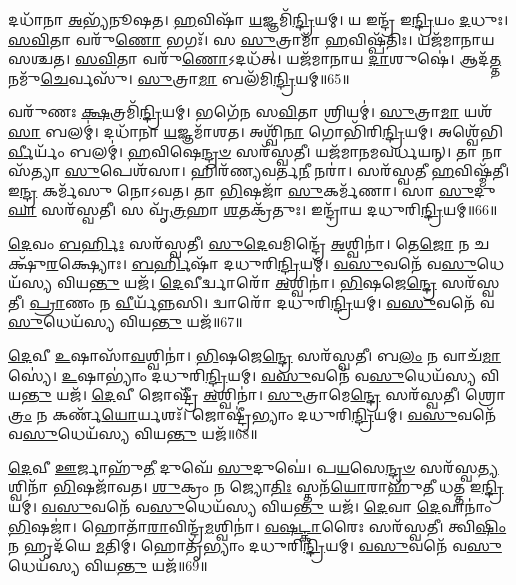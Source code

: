 𑌦𑌧𑌾᳴𑌨𑌾 \ul{𑌅}\-𑌭𑍍𑌯᳴𑌨𑍂𑌷𑌤।
\-\ul{𑌹}\-𑌵𑌿𑌷𑌾᳴ \ul{𑌯}\-𑌜𑍍𑌞𑌮𑌿᳴\-\ul{𑌨𑍍𑌦𑍍𑌰𑌿}\-𑌯𑌮𑍍।
𑌯 𑌇𑌨𑍍𑌦𑍍𑌰᳴ 𑌇\-\ul{𑌨𑍍𑌦𑍍𑌰𑌿}\-𑌯𑌂 \ul{𑌦}\-𑌧𑍁𑌃।
\-\ul{𑌸}\-\-\ul{𑌵𑌿}\-𑌤𑌾 𑌵𑌰𑍁᳴\-\ul{𑌣𑍋} 𑌭𑌗𑌃᳴।
𑌸 \ul{𑌸𑍁}\-𑌤𑍍𑌰𑌾𑌮𑌾᳴ \ul{𑌹}\-𑌵𑌿𑌷𑍍𑌪᳴𑌤𑌿𑌃।
𑌯𑌜᳴𑌮𑌾𑌨𑌾𑌯 𑌸𑌶𑍍𑌚𑌤।
\-\ul{𑌸}\-\-\ul{𑌵𑌿}\-𑌤𑌾 𑌵𑌰𑍁᳴\-\ul{𑌣𑍋}\-\-𑌽𑌦𑌧᳴𑌤𑍍।
𑌯𑌜᳴𑌮𑌾𑌨𑌾𑌯 \ul{𑌦𑌾}\-𑌶𑍁𑌷𑍇॑।
𑌆𑌦᳴\-\ul{𑌤𑍍𑌤} 𑌨𑌮𑍁᳴\-\ul{𑌚𑍇}\-𑌰𑍍𑌵𑌸𑍁᳴।
\-\ul{𑌸𑍁}\-𑌤𑍍𑌰𑌾\-\ul{𑌮𑌾} 𑌬𑌲᳴𑌮𑌿\-\ul{𑌨𑍍𑌦𑍍𑌰𑌿}\-𑌯𑌮𑍍॥65॥

𑌵𑌰𑍁᳴𑌣𑌃 \ul{𑌕𑍍𑌷}\-𑌤𑍍𑌰𑌮𑌿᳴\-\ul{𑌨𑍍𑌦𑍍𑌰𑌿}\-𑌯𑌮𑍍।
𑌭𑌗𑍇᳴𑌨 𑌸\-\ul{𑌵𑌿}\-𑌤𑌾 𑌶𑍍𑌰𑌿𑌯𑌮𑍍॑।
\-\ul{𑌸𑍁}\-𑌤𑍍𑌰𑌾\-\ul{𑌮𑌾} 𑌯𑌶᳴\-\ul{𑌸𑌾} 𑌬𑌲𑌮𑍍॑।
𑌦𑌧𑌾᳴𑌨𑌾 \ul{𑌯}\-𑌜𑍍𑌞𑌮𑌾᳴𑌶𑌤।
𑌅𑌶𑍍𑌵𑌿᳴\-\ul{𑌨𑌾} 𑌗𑍋𑌭𑌿᳴𑌰𑌿\-\ul{𑌨𑍍𑌦𑍍𑌰𑌿}\-𑌯𑌮𑍍।
𑌅𑌶𑍍𑌵𑍇᳴𑌭𑌿\-\ul{𑌰𑍍𑌵𑍀}\-𑌰𑍍𑌯𑌂᳴ 𑌬𑌲𑌮𑍍॑।
\-\ul{𑌹}\-𑌵𑌿𑌷𑍇\-\ul{𑌨𑍍𑌦𑍍𑌰}\-\-\ul{𑍞} 𑌸𑌰᳴𑌸𑍍𑌵𑌤𑍀।
𑌯𑌜᳴𑌮𑌾𑌨𑌮𑌵𑌰𑍍𑌧𑌯𑌨𑍍।
𑌤𑌾 𑌨𑌾𑌸᳴𑌤𑍍𑌯𑌾 \ul{𑌸𑍁}\-𑌪𑍇𑌶᳴𑌸𑌾।
𑌹𑌿𑌰᳴𑌣𑍍𑌯𑌵𑌰𑍍𑌤\-\ul{𑌨𑍀} 𑌨𑌰𑌾॑।
𑌸𑌰᳴𑌸𑍍𑌵𑌤𑍀 \ul{𑌹}\-𑌵𑌿𑌷𑍍𑌮᳴𑌤𑍀।
𑌇\-\ul{𑌨𑍍𑌦𑍍𑌰} 𑌕𑌰𑍍𑌮᳴𑌸𑍁 𑌨𑍋𑌽𑌵𑌤।
𑌤𑌾 \ul{𑌭𑌿}\-𑌷𑌜𑌾᳴ \ul{𑌸𑍁}\-𑌕𑌰𑍍𑌮᳴𑌣𑌾।
𑌸𑌾 \ul{𑌸𑍁}\-𑌦𑍁\-\ul{𑌘𑌾} 𑌸𑌰᳴𑌸𑍍𑌵𑌤𑍀।
𑌸 𑌵𑍃᳴\-\ul{𑌤𑍍𑌰}\-𑌹𑌾 \ul{𑌶}\-𑌤𑌕𑍍𑌰᳴𑌤𑍁𑌃।
𑌇𑌨𑍍𑌦𑍍𑌰𑌾᳴𑌯 𑌦𑌧𑍁𑌰𑌿\-\ul{𑌨𑍍𑌦𑍍𑌰𑌿}\-𑌯𑌮𑍍॥66॥\anuvakamend[\-\ul{𑌉}\-𑌭𑌾 𑌸𑌰᳴𑌸𑍍𑌵\-\ul{𑌤𑍀} 𑌬𑌲᳴𑌮𑌿\-\ul{𑌨𑍍𑌦𑍍𑌰𑌿}\-𑌯𑌨𑍍𑌨\-\ul{𑌰𑌾} 𑌷𑌟𑍍𑌚᳴]

\-\ul{𑌦𑍇}\-𑌵𑌂 \ul{𑌬}\-\-\ul{𑌰𑍍}\-𑌹𑌿𑌃 𑌸𑌰᳴𑌸𑍍𑌵𑌤𑍀।
\-\ul{𑌸𑍁}\-\-\ul{𑌦𑍇}\-𑌵𑌮𑌿𑌨𑍍𑌦𑍍𑌰𑍇᳴ \ul{𑌅}\-𑌶𑍍𑌵𑌿𑌨𑌾॑।
𑌤𑍇\-\ul{𑌜𑍋} 𑌨 𑌚𑌕𑍍𑌷𑍁᳴\-\ul{𑌰}\-𑌕𑍍𑌷𑍍𑌯𑍋𑌃।
\-\ul{𑌬}\-\-\ul{𑌰𑍍}\-𑌹𑌿𑌷𑌾᳴ 𑌦𑌧𑍁𑌰𑌿\-\ul{𑌨𑍍𑌦𑍍𑌰𑌿}\-𑌯𑌮𑍍।
\-\ul{𑌵}\-\-\ul{𑌸𑍁}\-𑌵𑌨𑍇᳴ 𑌵\-\ul{𑌸𑍁}\-𑌧𑍇𑌯᳴𑌸𑍍𑌯 𑌵𑌿𑌯\-\ul{𑌨𑍍𑌤𑍁} 𑌯𑌜᳴।
\-\ul{𑌦𑍇}\-𑌵𑍀𑌰𑍍𑌦𑍍𑌵𑌾𑌰𑍋᳴ \ul{𑌅}\-𑌶𑍍𑌵𑌿𑌨𑌾॑।
\-\ul{𑌭𑌿}\-𑌷𑌜𑍇\-\ul{𑌨𑍍𑌦𑍍𑌰𑍇} 𑌸𑌰᳴𑌸𑍍𑌵𑌤𑍀।
\-\ul{𑌪𑍍𑌰𑌾}\-𑌣𑌂 𑌨 \ul{𑌵𑍀}\-𑌰𑍍𑌯᳴\-\ul{𑌨𑍍𑌨}\-𑌸𑌿।
𑌦𑍍𑌵𑌾𑌰𑍋᳴ 𑌦𑌧𑍁𑌰𑌿\-\ul{𑌨𑍍𑌦𑍍𑌰𑌿}\-𑌯𑌮𑍍।
\-\ul{𑌵}\-\-\ul{𑌸𑍁}\-𑌵𑌨𑍇᳴ 𑌵\-\ul{𑌸𑍁}\-𑌧𑍇𑌯᳴𑌸𑍍𑌯 𑌵𑌿𑌯\-\ul{𑌨𑍍𑌤𑍁} 𑌯𑌜᳴॥67॥

\-\ul{𑌦𑍇}\-𑌵𑍀 \ul{𑌉}\-𑌷𑌾𑌸𑌾᳴\-\ul{𑌵}\-𑌶𑍍𑌵𑌿𑌨𑌾॑।
\-\ul{𑌭𑌿}\-𑌷𑌜𑍇\-\ul{𑌨𑍍𑌦𑍍𑌰𑍇} 𑌸𑌰᳴𑌸𑍍𑌵𑌤𑍀।
𑌬\-\ul{𑌲𑌂} 𑌨 𑌵𑌾𑌚᳴\-\ul{𑌮𑌾}\-𑌸𑍍𑌯𑍇॑।
\-\ul{𑌉}\-𑌷𑌾𑌭𑍍𑌯𑌾𑌂॑ 𑌦𑌧𑍁𑌰𑌿\-\ul{𑌨𑍍𑌦𑍍𑌰𑌿}\-𑌯𑌮𑍍।
\-\ul{𑌵}\-\-\ul{𑌸𑍁}\-𑌵𑌨𑍇᳴ 𑌵\-\ul{𑌸𑍁}\-𑌧𑍇𑌯᳴𑌸𑍍𑌯 𑌵𑌿𑌯\-\ul{𑌨𑍍𑌤𑍁} 𑌯𑌜᳴।
\-\ul{𑌦𑍇}\-𑌵𑍀 𑌜𑍋𑌷𑍍𑌟𑍍𑌰𑍀᳴ \ul{𑌅}\-𑌶𑍍𑌵𑌿𑌨𑌾॑।
\-\ul{𑌸𑍁}\-𑌤𑍍𑌰𑌾𑌮𑍇\-\ul{𑌨𑍍𑌦𑍍𑌰𑍇} 𑌸𑌰᳴𑌸𑍍𑌵𑌤𑍀।
𑌶𑍍𑌰𑍋\-\ul{𑌤𑍍𑌰𑌂} 𑌨 𑌕𑌰𑍍𑌣᳴\-\ul{𑌯𑍋}\-𑌰𑍍𑌯𑌶𑌃᳴।
𑌜𑍋𑌷𑍍𑌟𑍍𑌰𑍀॑𑌭𑍍𑌯𑌾𑌂 𑌦𑌧𑍁𑌰𑌿\-\ul{𑌨𑍍𑌦𑍍𑌰𑌿}\-𑌯𑌮𑍍।
\-\ul{𑌵}\-\-\ul{𑌸𑍁}\-𑌵𑌨𑍇᳴ 𑌵\-\ul{𑌸𑍁}\-𑌧𑍇𑌯᳴𑌸𑍍𑌯 𑌵𑌿𑌯\-\ul{𑌨𑍍𑌤𑍁} 𑌯𑌜᳴॥68॥

\-\ul{𑌦𑍇}\-𑌵𑍀 \ul{𑌊}\-𑌰𑍍𑌜𑌾𑌹𑍁᳴\-\ul{𑌤𑍀} 𑌦𑍁𑌘𑍇᳴ \ul{𑌸𑍁}\-𑌦𑍁𑌘𑍇॑।
𑌪\-\ul{𑌯}\-𑌸𑍇\-\ul{𑌨𑍍𑌦𑍍𑌰}\-\-\ul{𑍞} 𑌸𑌰᳴𑌸𑍍𑌵\-\ul{𑌤𑍍𑌯}\-𑌶𑍍𑌵𑌿𑌨𑌾᳴ \ul{𑌭𑌿}\-𑌷𑌜𑌾᳴𑌵𑌤।
\-\ul{𑌶𑍁}\-𑌕𑍍𑌰𑌂 𑌨 𑌜𑍍𑌯𑍋\-\ul{𑌤𑌿𑌃} 𑌸𑍍𑌤𑌨᳴\-\ul{𑌯𑍋}\-𑌰𑌾𑌹𑍁᳴𑌤𑍀 𑌧𑌤𑍍𑌤 𑌇\-\ul{𑌨𑍍𑌦𑍍𑌰𑌿}\-𑌯𑌮𑍍।
\-\ul{𑌵}\-\-\ul{𑌸𑍁}\-𑌵𑌨𑍇᳴ 𑌵\-\ul{𑌸𑍁}\-𑌧𑍇𑌯᳴𑌸𑍍𑌯 𑌵𑌿𑌯\-\ul{𑌨𑍍𑌤𑍁} 𑌯𑌜᳴।
\-\ul{𑌦𑍇}\-𑌵𑌾 \ul{𑌦𑍇}\-𑌵𑌾𑌨𑌾𑌂॑ \ul{𑌭𑌿}\-𑌷𑌜𑌾॑।
𑌹𑍋𑌤𑌾᳴\-\ul{𑌰𑌾}\-𑌵𑌿𑌨𑍍𑌦𑍍𑌰᳴\-\ul{𑌮}\-𑌶𑍍𑌵𑌿𑌨𑌾॑।
\-\ul{𑌵}\-\-\ul{𑌷}\-\-\ul{𑌟𑍍𑌕𑌾}\-𑌰𑍈𑌃 𑌸𑌰᳴𑌸𑍍𑌵𑌤𑍀।
𑌤𑍍𑌵𑌿\-\ul{𑌷𑌿𑌂} 𑌨 𑌹𑍃𑌦᳴𑌯𑍇 \ul{𑌮}\-𑌤𑌿𑌮𑍍।
𑌹𑍋𑌤𑍃᳴𑌭𑍍𑌯𑌾𑌂 𑌦𑌧𑍁𑌰𑌿\-\ul{𑌨𑍍𑌦𑍍𑌰𑌿}\-𑌯𑌮𑍍।
\-\ul{𑌵}\-\-\ul{𑌸𑍁}\-𑌵𑌨𑍇᳴ 𑌵\-\ul{𑌸𑍁}\-𑌧𑍇𑌯᳴𑌸𑍍𑌯 𑌵𑌿𑌯\-\ul{𑌨𑍍𑌤𑍁} 𑌯𑌜᳴॥69॥

